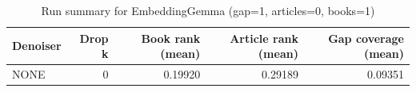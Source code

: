 \begin{table}
\caption{Run summary for EmbeddingGemma (gap=1, articles=0, books=1)}
\label{tab:summary_gap1_embeddinggemma_a0_b1}
\begin{tabular}{lrrrr}
\toprule
Denoiser & Drop k & Book rank (mean) & Article rank (mean) & Gap coverage (mean) \\
\midrule
NONE & 0 & 0.19920 & 0.29189 & 0.09351 \\
\bottomrule
\end{tabular}
\end{table}